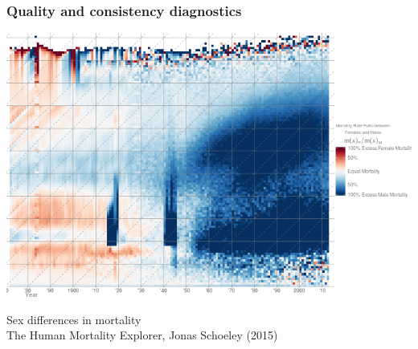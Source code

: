 \documentclass[20pt]{beamer}
\begin{document}


\begin{frame}
\frametitle{Quality and consistency diagnostics}
\begin{center}
\includegraphics[scale=.8]{Figures/Schoeley2.png}
\end{center}
Sex differences in mortality\\The Human Mortality Explorer, Jonas Schoeley
(2015)
\end{frame}


\end{document}

